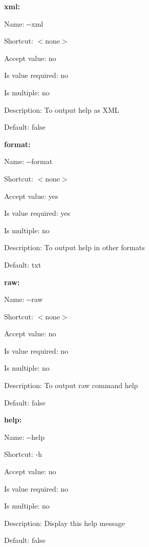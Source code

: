 {\bfseries xml\+:}


\begin{DoxyItemize}
\item Name\+: {\ttfamily -\/-\/xml}
\item Shortcut\+: $<$none$>$
\item Accept value\+: no
\item Is value required\+: no
\item Is multiple\+: no
\item Description\+: To output help as X\+M\+L
\item Default\+: {\ttfamily false}
\end{DoxyItemize}

{\bfseries format\+:}


\begin{DoxyItemize}
\item Name\+: {\ttfamily -\/-\/format}
\item Shortcut\+: $<$none$>$
\item Accept value\+: yes
\item Is value required\+: yes
\item Is multiple\+: no
\item Description\+: To output help in other formats
\item Default\+: {\ttfamily \textquotesingle{}txt\textquotesingle{}}
\end{DoxyItemize}

{\bfseries raw\+:}


\begin{DoxyItemize}
\item Name\+: {\ttfamily -\/-\/raw}
\item Shortcut\+: $<$none$>$
\item Accept value\+: no
\item Is value required\+: no
\item Is multiple\+: no
\item Description\+: To output raw command help
\item Default\+: {\ttfamily false}
\end{DoxyItemize}

{\bfseries help\+:}


\begin{DoxyItemize}
\item Name\+: {\ttfamily -\/-\/help}
\item Shortcut\+: {\ttfamily -\/h}
\item Accept value\+: no
\item Is value required\+: no
\item Is multiple\+: no
\item Description\+: Display this help message
\item Default\+: {\ttfamily false}
\end{DoxyItemize}

